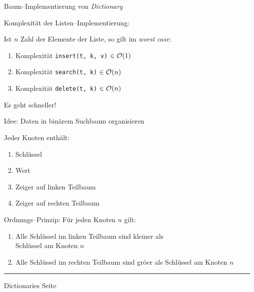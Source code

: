 \begin{slide}{}
\normalsize

\begin{center}
Baum--Implementierung von \textsl{Dictionary}
\end{center}
\vspace*{0.5cm}

\footnotesize
Komplexit\"at der Listen--Implementierung: 

Ist $n$ Zahl der Elemente der Liste, so gilt im \emph{worst case}:
\begin{enumerate}
\item Komplexit\"at \texttt{insert(t, k, v)} $\in \mathcal{O}(1)$
\item Komplexit\"at \texttt{search(t, k)} $\in \mathcal{O}(n)$
\item Komplexit\"at \texttt{delete(t, k)} $\in \mathcal{O}(n)$
\end{enumerate}
Es geht schneller!

Idee: Daten in bin\"arem Suchbaum organisieren

Jeder Knoten enth\"alt:
\begin{enumerate}
\item Schl\"ussel
\item Wert
\item Zeiger auf linken Teilbaum
\item Zeiger auf rechten Teilbaum
\end{enumerate}

Ordnungs--Prinzip: F\"ur jeden Knoten $n$ gilt:
\begin{enumerate}
\item Alle Schl\"ussel im linken Teilbaum sind kleiner als \\
      Schl\"ussel am Knoten $n$
\item Alle Schl\"ussel im rechten Teilbaum sind gr\"o\3er als
      Schl\"ussel am Knoten $n$
\end{enumerate}


\vspace*{\fill}
\tiny \addtocounter{mypage}{1}
\rule{17cm}{1mm}
Dictionaries  \hspace*{\fill} Seite 
\end{slide}


